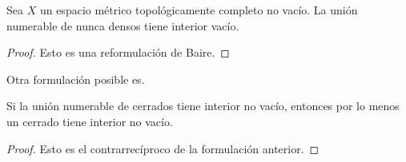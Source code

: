 \begin{theorem}
	Sea $X$ un espacio métrico topológicamente completo no vacío. La unión numerable de nunca densos tiene interior vacío.
\end{theorem}

\begin{proof}
	Esto es una reformulación de Baire.
\end{proof}

Otra formulación posible es.

\begin{theorem}
	Si la unión numerable de cerrados tiene interior no vacío, entonces por lo menos un cerrado tiene interior no vacío.
\end{theorem}

\begin{proof}
	Esto es el contrarrecíproco de la formulación anterior.
\end{proof}


